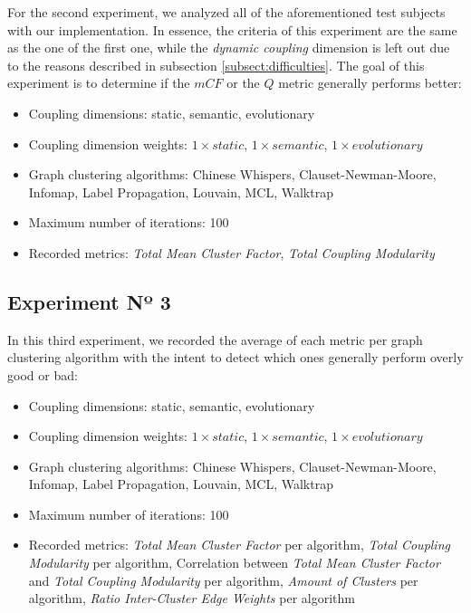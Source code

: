 \documentclass[12pt,a4paper]{report}
\begin{document}
For the second experiment, we analyzed all of the
aforementioned test subjects with our implementation. In essence, the criteria
of this experiment are the same as the one of the first one, while the \textit{
dynamic coupling} dimension is left out due to the reasons described in
subsection \ref{subsect:difficulties}. The goal of this experiment is to
determine if the $mCF$ or the $Q$ metric generally performs better:
\begin{itemize}[noitemsep]
    \item Coupling dimensions: static, semantic, evolutionary
    \item Coupling dimension weights: $1 \times static$, $1 \times semantic$, $1 \times evolutionary$
    \item Graph clustering algorithms: Chinese Whispers, Clauset-Newman-Moore, Infomap, Label Propagation, Louvain, MCL, Walktrap
    \item Maximum number of iterations: 100
    \item Recorded metrics:
    \textit{Total Mean Cluster Factor},
    \textit{Total Coupling Modularity}
\end{itemize}


\subsection{Experiment Nº 3}

In this third experiment, we recorded
the average of each metric per graph clustering algorithm with the intent to
detect which ones generally perform overly good or bad:
\begin{itemize}[noitemsep]
    \item Coupling dimensions: static, semantic, evolutionary
    \item Coupling dimension weights: $1 \times static$, $1 \times semantic$, $1 \times evolutionary$
    \item Graph clustering algorithms: Chinese Whispers, Clauset-Newman-Moore, Infomap, Label Propagation, Louvain, MCL, Walktrap
    \item Maximum number of iterations: 100
    \item Recorded metrics:
    \textit{Total Mean Cluster Factor} per algorithm,
    \textit{Total Coupling Modularity} per algorithm,
    Correlation between \textit{Total Mean Cluster Factor} and \textit{Total Coupling Modularity} per algorithm,
    \textit{Amount of Clusters} per algorithm,
    \textit{Ratio Inter-Cluster Edge Weights} per algorithm
\end{itemize}
\end{document}
